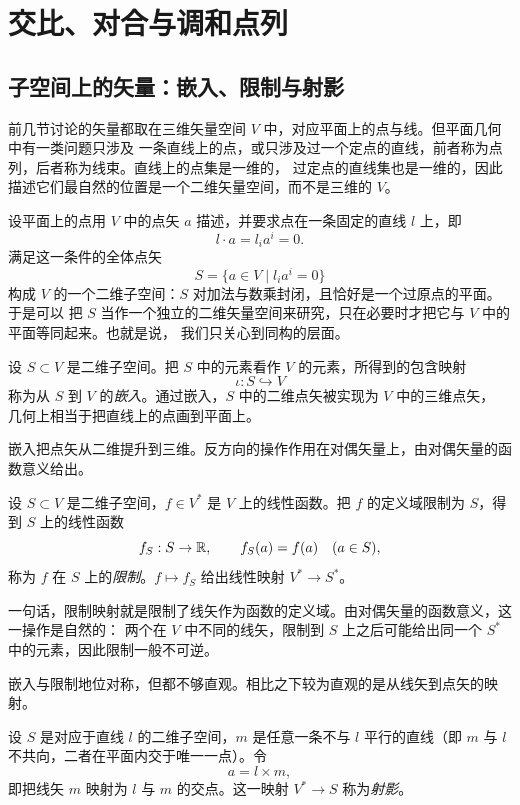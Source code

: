 \chapter{交比、对合与调和点列}

\section{子空间上的矢量：嵌入、限制与射影}

前几节讨论的矢量都取在三维矢量空间 $V$ 中，对应平面上的点与线。但平面几何中有一类问题只涉及
一条直线上的点，或只涉及过一个定点的直线，前者称为点列，后者称为线束。直线上的点集是一维的，
过定点的直线集也是一维的，因此描述它们最自然的位置是一个二维矢量空间，而不是三维的 $V$。

设平面上的点用 $V$ 中的点矢 $a$ 描述，并要求点在一条固定的直线 $l$ 上，即
\[
l\cdot a=l_ia^i=0 .
\]
满足这一条件的全体点矢
\[
S=\{a\in V\mid l_ia^i=0\}
\]
构成 $V$ 的一个二维子空间：$S$ 对加法与数乘封闭，且恰好是一个过原点的平面。于是可以
把 $S$ 当作一个独立的二维矢量空间来研究，只在必要时才把它与 $V$ 中的平面等同起来。也就是说，
我们只关心到同构的层面。

\begin{definition}[嵌入]
设 $S\subset V$ 是二维子空间。把 $S$ 中的元素看作 $V$ 的元素，所得到的包含映射
\[
\iota:S\hookrightarrow V
\]
称为从 $S$ 到 $V$ 的\emph{嵌入}。通过嵌入，$S$ 中的二维点矢被实现为 $V$ 中的三维点矢，
几何上相当于把直线上的点画到平面上。
\end{definition}

嵌入把点矢从二维提升到三维。反方向的操作作用在对偶矢量上，由对偶矢量的函数意义给出。

\begin{definition}[限制]
设 $S\subset V$ 是二维子空间，$f\in V^*$ 是 $V$ 上的线性函数。把 $f$ 的定义域限制为
$S$，得到 $S$ 上的线性函数
\[
f_S:S\to\mathbb{R},\qquad f_S(a)=f(a)\quad(a\in S),
\]
称为 $f$ 在 $S$ 上的\emph{限制}。$f\mapsto f_S$ 给出线性映射 $V^*\to S^*$。
\end{definition}

一句话，限制映射就是限制了线矢作为函数的定义域。由对偶矢量的函数意义，这一操作是自然的：
两个在 $V$ 中不同的线矢，限制到 $S$ 上之后可能给出同一个 $S^*$ 中的元素，因此限制一般不可逆。

嵌入与限制地位对称，但都不够直观。相比之下较为直观的是从线矢到点矢的映射。

\begin{definition}[射影]
设 $S$ 是对应于直线 $l$ 的二维子空间，$m$ 是任意一条不与 $l$ 平行的直线（即
$m$ 与 $l$ 不共向，二者在平面内交于唯一一点）。令
\[
a=l\times m,
\]
即把线矢 $m$ 映射为 $l$ 与 $m$ 的交点。这一映射 $V^*\to S$ 称为\emph{射影}。
\end{definition}

